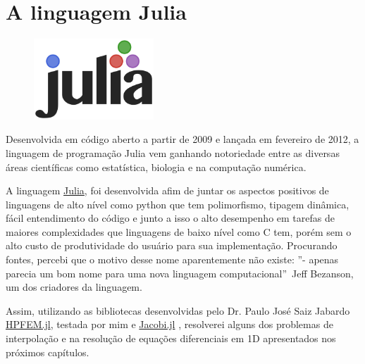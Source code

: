  
\section{A linguagem Julia}
\begin{figure}[H]
\centering
\includegraphics[width=0.4\textwidth,left]{figuras/julia.png}
\end{figure}
Desenvolvida em código aberto a partir de 2009 e lançada em fevereiro de 2012, a linguagem de programação Julia vem ganhando notoriedade entre as diversas áreas científicas como estatística, biologia e na computação numérica.

A linguagem \href{http://julialang.org/}{Julia}, foi desenvolvida afim de juntar os aspectos positivos de linguagens de alto nível como python que tem polimorfismo, tipagem dinâmica, fácil entendimento do código e junto a isso o alto desempenho em tarefas de maiores complexidades que linguagens de baixo nível como C tem, porém sem o  alto custo de produtividade do usuário para sua implementação. Procurando fontes, percebi que o motivo desse nome aparentemente não existe: ''- apenas parecia um bom nome para uma nova linguagem computacional''\  Jeff Bezanson, um dos criadores da linguagem.

Assim, utilizando as bibliotecas desenvolvidas pelo  Dr. Paulo José Saiz Jabardo \href{www.github.com/pjabardo/HPFEM.jl}{HPFEM.jl}, testada por mim e \href{www.github.com/pjabardo/Jacobi.jl}{Jacobi.jl} , resolverei alguns dos problemas de interpolação e na resolução de equações diferenciais em 1D apresentados nos próximos capítulos.
 
\pagebreak


%
%
%




